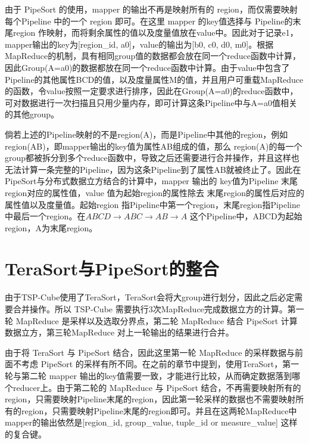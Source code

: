 由于 PipeSort 的使用，mapper 的输出不再是映射所有的 region，而仅需要映射 每个Pipeline 中的一个 region 即可。在这里 mapper 的key值选择与 Pipeline的末尾region 作映射，而将剩余属性的值以及度量值放在value中。因此对于记录e1，mapper输出的key为[region\_id, a0]，value的输出为[b0, c0, d0, m0]。根据MapReduce的机制，具有相同group值的数据都会放在同一个reduce函数中计算，因此Group(A=a0)的数据都放在同一个reduce函数中计算。由于value中包含了Pipeline的其他属性BCD的值，以及度量属性M的值，并且用户可重载MapReduce的函数，令value按照一定要求进行排序，因此在Group(A=a0)的reduce函数中，可对数据进行一次扫描且只用少量内存，即可计算这条Pipeline中与A=a0值相关的其他group。

倘若上述的Pipeline映射的不是region(A)，而是Pipeline中其他的region，例如region(AB)，即mapper输出的key值为属性AB组成的值，那么 region(A)的每一个group都被拆分到多个reduce函数中，导致之后还需要进行合并操作，并且这样也无法计算一条完整的Pipeline，因为这条Pipeline到了属性AB就被终止了。因此在PipeSort与分布式数据立方结合的计算中，mapper 输出的 key值为Pipeline 末尾region对应的属性值，value 值为起始region的属性除去 末尾region的属性后对应的属性值以及度量值。起始region 指Pipeline中第一个region，末尾region指Pipeline中最后一个region。在$ABCD\rightarrow ABC\rightarrow AB\rightarrow A$ 这个Pipeline中，ABCD为起始region，A为末尾region。



\section{TeraSort与PipeSort的整合}

由于TSP-Cube使用了TeraSort，TeraSort会将大group进行划分，因此之后必定需要合并操作。所以 TSP-Cube 需要执行3次MapReduce完成数据立方的计算。第一轮 MapReduce 是采样以及选取分界点，第二轮 MapReduce 结合 PipeSort 计算数据立方，第三轮MapReduce 对上一轮输出的结果进行合并。

由于将 TeraSort 与 PipeSort 结合，因此这里第一轮 MapReduce 的采样数据与前面不考虑 PipeSort 的采样有所不同。在之前的章节中提到，使用TeraSort，第一轮与第二轮 mapper 输出的key值需要一致，才能进行比较，从而确定数据落到哪个reducer上。由于第二轮的 MapReduce 与 PipeSort 结合，不再需要映射所有的region，只需要映射Pipeline末尾的region，因此第一轮采样的数据也不需要映射所有的region，只需要映射Pipeline末尾的region即可。并且在这两轮MapReduce中 mapper的输出依然是[region\_id, group\_value, tuple\_id or measure\_value] 这样的复合键。




